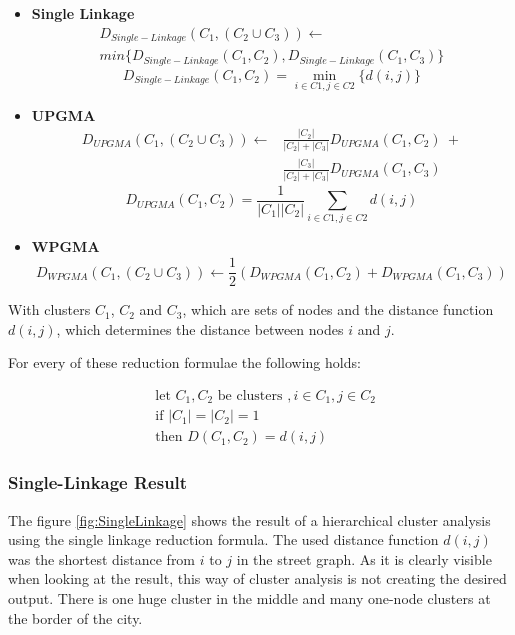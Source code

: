 \documentclass[11pt, a4paper]{report}
\begin{document}
\begin{itemize}
    \item \textbf{Single Linkage}
    \begin{multline}
    D_{Single-Linkage}(C_1, (C_2 \cup C_3)) \leftarrow \\
    min \{ D_{Single-Linkage}(C_1, C_2), D_{Single-Linkage}(C_1, C_3) \}
    \end{multline}
    \begin{equation}
    D_{Single-Linkage}(C_1, C_2) = \min_{i\in{C1}, j\in{C2}}\{d(i, j)\}
    \end{equation}
    \item \textbf{UPGMA}
    \begin{equation}
    \begin{split}
    D_{UPGMA}(C_1, (C_2 \cup C_3)) \leftarrow &\frac{|C_2|}{|C_2|+|C_3|}D_{UPGMA}(C_1, C_2)\ + \\ &\frac{|C_3|}{|C_2|+|C_3|}D_{UPGMA}(C_1, C_3)
    \end{split}
    \end{equation}
    \begin{equation}
    D_{UPGMA}(C_1, C_2) = \dfrac{1}{|C_1||C_2|} \sum_{i\in{C1}, j\in{C2}}{d(i, j)}
    \end{equation}
    \item \textbf{WPGMA}
    \begin{equation}
    D_{WPGMA}(C_1, (C_2 \cup C_3)) \leftarrow \frac{1}{2} (D_{WPGMA}(C_1, C_2) + D_{WPGMA}(C_1, C_3))
    \end{equation}
\end{itemize}

With clusters $C_1$, $C_2$ and $C_3$, which are sets of nodes and the distance function $d(i, j)$, which determines the distance between nodes $i$ and $j$.

For every of these reduction formulae the following holds:

\begin{equation}
\begin{split}
&\textrm{let }C_1, C_2\textrm{ be clusters },i \in C_1, j \in C_2 \\
&\textrm{if }|C_1| = |C_2| = 1 \\
&\textrm{then }D(C_1, C_2) = d(i, j)
\end{split}
\end{equation}

\subsubsection{Single-Linkage Result}
The figure \ref{fig:SingleLinkage} shows the result of a hierarchical cluster analysis using the single linkage reduction formula. The used distance function $d(i, j)$ was the shortest distance from $i$ to $j$ in the street graph. As it is clearly visible when looking at the result, this way of cluster analysis is not creating the desired output. There is one huge cluster in the middle and many one-node clusters at the border of the city.
\end{document}
